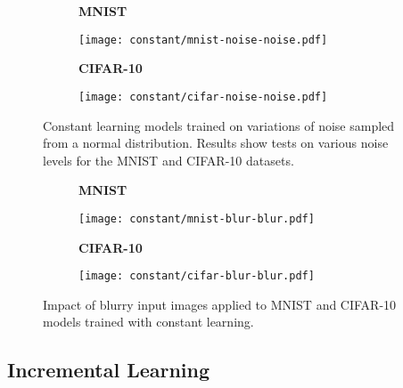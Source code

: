 \documentclass[conference]{IEEEtran}
\begin{document}
\begin{figure}[H]
    \centering
    \begin{subfigure}[h]{0.30\textwidth}
        \centering
        \textbf{MNIST}\par\medskip
        \texttt{[image: constant/mnist-noise-noise.pdf]}
        \caption{} 
        \label{fig:constant-mnist-noise}
    \end{subfigure}
    \quad
    \begin{subfigure}[h]{0.30\textwidth}  
        \centering 
        \textbf{CIFAR-10}\par\medskip
        \texttt{[image: constant/cifar-noise-noise.pdf]}
        \caption{} 
        \label{fig:constant-cifar-noise}
    \end{subfigure}
    \captionsetup{width=0.80\linewidth}
    \caption{Constant learning models trained on variations of noise sampled from a normal distribution. Results show tests on various noise levels for the MNIST and CIFAR-10 datasets.} 
    \label{fig:constant-noise}
\end{figure}

\begin{figure}[H]
    \centering
    \begin{subfigure}[h]{0.30\textwidth}
        \centering
        \textbf{MNIST}\par\medskip
        \texttt{[image: constant/mnist-blur-blur.pdf]}
        \caption{} 
        \label{fig:constant-mnist-blur}
    \end{subfigure}
    \quad
    \begin{subfigure}[h]{0.30\textwidth}  
        \centering 
        \textbf{CIFAR-10}\par\medskip
        \texttt{[image: constant/cifar-blur-blur.pdf]}
        \caption{} 
        \label{fig:constant-cifar-blur}
    \end{subfigure}
    \captionsetup{width=0.80\linewidth}
    \caption{Impact of blurry input images applied to MNIST and CIFAR-10 models trained with constant learning.} 
    \label{fig:constant-blur}
\end{figure}

\subsection{Incremental Learning}
\end{document}
